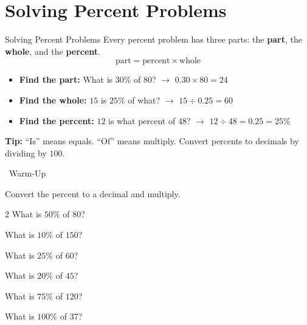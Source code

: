 \section{Solving Percent Problems}

\begin{quickReview}{Solving Percent Problems}
Every percent problem has three parts: the \textbf{part}, the \textbf{whole}, and the \textbf{percent}.
$$\text{part} = \text{percent} \times \text{whole}$$

\begin{itemize}[leftmargin=*]
    \item \textbf{Find the part:} What is $30\%$ of $80$? $\to$ $0.30 \times 80 = 24$
    \item \textbf{Find the whole:} $15$ is $25\%$ of what? $\to$ $15 \div 0.25 = 60$
    \item \textbf{Find the percent:} $12$ is what percent of $48$? $\to$ $12 \div 48 = 0.25 = 25\%$
\end{itemize}

\medskip
\textbf{Tip:} ``Is'' means equals. ``Of'' means multiply. Convert percents to decimals by dividing by $100$.
\end{quickReview}

\begin{practiceBox}[funGreen]{\faSun~Warm-Up}

Convert the percent to a decimal and multiply.

\begin{multicols}{2}
\prob What is $50\%$ of $80$? \answerBlank[3cm]

\prob What is $10\%$ of $150$? \answerBlank[3cm]

\prob What is $25\%$ of $60$? \answerBlank[3cm]

\prob What is $20\%$ of $45$? \answerBlank[3cm]

\prob What is $75\%$ of $120$? \answerBlank[3cm]

\prob What is $100\%$ of $37$? \answerBlank[3cm]
\end{multicols}
\end{practiceBox}

